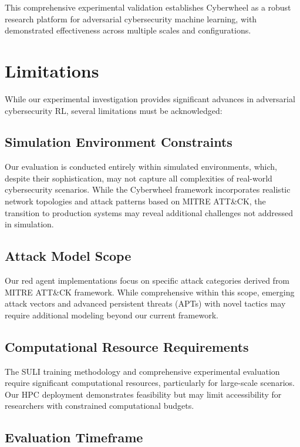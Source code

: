 \documentclass[11pt]{article}
\theoremstyle{definition}
\theoremstyle{plain}
\begin{document}
This comprehensive experimental validation establishes Cyberwheel as a robust research platform for adversarial cybersecurity machine learning, with demonstrated effectiveness across multiple scales and configurations.

\section{Limitations}

While our experimental investigation provides significant advances in adversarial cybersecurity RL, several limitations must be acknowledged:

\subsection{Simulation Environment Constraints}

Our evaluation is conducted entirely within simulated environments, which, despite their sophistication, may not capture all complexities of real-world cybersecurity scenarios. While the Cyberwheel framework incorporates realistic network topologies and attack patterns based on MITRE ATT\&CK, the transition to production systems may reveal additional challenges not addressed in simulation.

\subsection{Attack Model Scope}

Our red agent implementations focus on specific attack categories derived from MITRE ATT\&CK framework. While comprehensive within this scope, emerging attack vectors and advanced persistent threats (APTs) with novel tactics may require additional modeling beyond our current framework.

\subsection{Computational Resource Requirements}

The SULI training methodology and comprehensive experimental evaluation require significant computational resources, particularly for large-scale scenarios. Our HPC deployment demonstrates feasibility but may limit accessibility for researchers with constrained computational budgets.

\subsection{Evaluation Timeframe}
\end{document}
